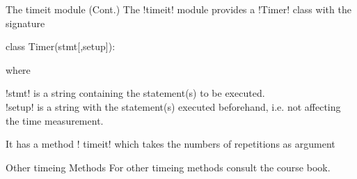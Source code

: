 \documentclass[hyperref={pdfpagelabels=false},table, handout]{beamer}
\begin{document}
\begin{frame}[fragile]{The timeit module \hfill (Cont.)}
 The \pyth!timeit! module provides a \pyth!Timer! class
 with the signature
\begin{python}
class Timer(stmt[,setup]):  
\end{python}
\vfill
where 

\pyth!stmt! is a string containing the statement(s) to be executed.\\
\pyth!setup! is a string with the statement(s) executed beforehand, i.e. not affecting the time measurement.

\vfill

It has a method \pyth! timeit! which takes the numbers of repetitions as argument
\vfill
\end{frame}


\begin{frame}{Other timeing Methods}
\vfill
For other timeing methods consult the course book.
\vfill
\end{frame}
\end{document}
